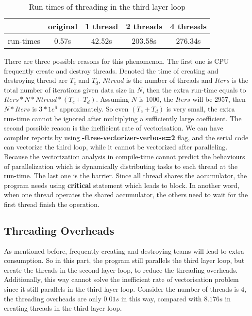 \documentclass[10pt, a4paper]{article}
\begin{document}
    \begin{table}[h!]
    \centering
    \begin{tabular}{ |c|c|c|c|c| } 
     \hline
              & original & 1 thread & 2 threads & 4 threads \\ \hline
     run-times & 0.57s    & 42.52s   & 203.58s   & 276.34s   \\ \hline
    \end{tabular}
    \caption{Run-times of threading in the third layer loop}
    \end{table}

    There are three possible reasons for this phenomenon. The first one is CPU frequently create and destroy threads. Denoted the time of creating and destroying thread are $T_c$ and $T_d$, $Ntread$ is the number of threads and $Iters$ is the total number of iterations given data size in $N$, then the extra run-time equals to $Iters * N * Ntread * (T_c + T_d)$. Assuming $N$ is $1000$, the $Iters$ will be 2957, then $N*Iters$ is $3*1e^6$ approximately. So even $(T_c + T_d)$ is very small, the extra run-time cannot be ignored after multiplying a sufficiently large coefficient. The second possible reason is the inefficient rate of vectorisation. We can have compiler reports by using \textbf{-ftree-vectorizer-verbose=2} flag, and the serial code can vectorize the third loop, while it cannot be vectorized after paralleling. Because the vectorization analysis in compile-time cannot predict the behaviours of parallelization which is dynamically distributing tasks to each thread at the run-time. The last one is the barrier. Since all thread shares the accumulator, the program needs using \textbf{critical} statement which leads to block. In another word, when one thread operates the shared accumulator, the others need to wait for the first thread finish the operation.

  
	\subsection{Threading Overheads}
	
    As mentioned before, frequently creating and destroying teams will lead to extra consumption. So in this part, the program still parallels the third layer loop, but create the threads in the second layer loop, to reduce the threading overheads. Additionally, this way cannot solve the inefficient rate of vectorisation problem since it still parallels in the third layer loop. Consider the number of threads is 4, the threading overheads are only $0.01s$ in this way, compared with $8.176s$ in creating threads in the third layer loop. 
	
\end{document}
